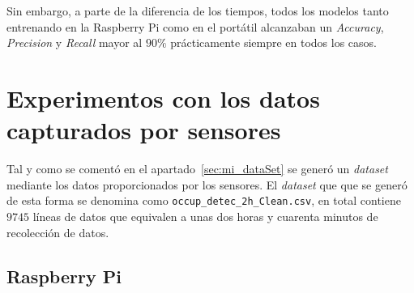 \documentclass[a4paper, 12pt]{book}
\begin{document}
Sin embargo, a parte de la diferencia de los tiempos, todos los modelos tanto entrenando en la Raspberry Pi como en el portátil alcanzaban un \textit{Accuracy}, \textit{Precision} y \textit{Recall} mayor al $90\%$ prácticamente siempre en todos los casos.

\section{Experimentos con los datos capturados por sensores}
\label{sec:exp_dSensados}

Tal y como se comentó en el apartado~\ref{sec:mi_dataSet} se generó un \textit{dataset} mediante los datos proporcionados por los sensores. El \textit{dataset} que que se generó de esta forma se denomina como \texttt{occup\_detec\_2h\_Clean.csv}, en total contiene $9745$ líneas de datos que equivalen a unas dos horas y cuarenta minutos de recolección de datos.

\subsection{Raspberry Pi}
\label{subsec:rasp_sensados}
\end{document}
